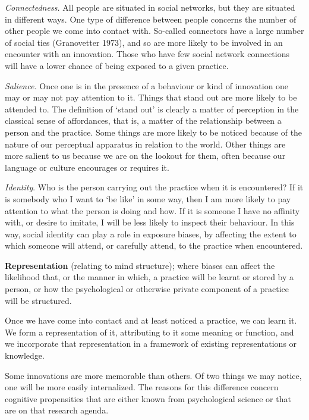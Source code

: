 \textit{Connectedness.} All people are situated in social networks, 
but they are situated in different ways. One type of difference between 
people concerns the number of other people we come into contact with. 
So-called connectors have a large number of social ties (Granovetter 
1973), and so are more likely to be involved in an encounter with an 
innovation. Those who have few social network connections will have a 
lower chance of being exposed to a given practice. 



\textit{Salience. }Once one is in the presence of a behaviour or kind 
of innovation one may or may not pay attention to it. Things that stand 
out are more likely to be attended to. The definition of \textquoteleft stand out' is 
clearly a matter of perception in the classical sense of affordances, 
that is, a matter of the relationship between a person and the practice. 
Some things are more likely to be noticed because of the nature of our 
perceptual apparatus in relation to the world. Other things are more 
salient to us because we are on the lookout for them, often because our 
language or culture encourages or requires it.



\textit{Identity}. Who is the person carrying out the practice when 
it is encountered? If it is somebody who I want to \textquoteleft be like' in some 
way, then I am more likely to pay attention to what the person is doing 
and how. If it is someone I have no affinity with, or desire to imitate, 
I will be less likely to inspect their behaviour. In this way, social 
identity can play a role in exposure biases, by affecting the extent to 
which someone will attend, or carefully attend, to the practice when 
encountered.



\textbf{Representation }(relating to mind structure); where biases can 
affect the likelihood that, or the manner in which, a practice will be 
learnt or stored by a person, or how the psychological or otherwise 
private component of a practice will be structured. 



Once we have come into contact and at least noticed a practice, we can 
learn it. We form a representation of it, attributing to it some meaning 
or function, and we incorporate that representation in a framework of 
existing representations or knowledge. 



Some innovations are more memorable than others. Of two things we may 
notice, one will be more easily internalized. The reasons for this 
difference concern cognitive propensities that are either known from 
psychological science or that are on that research agenda. 



